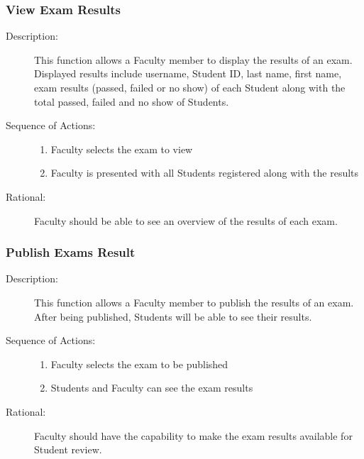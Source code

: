    \subsubsection{\large View Exam Results} 
   \begin{boxed} %
      \begin{description}
         \item[Description:\label{desc:view_results}]
      This function allows a Faculty member to display the results of an
         exam. Displayed results include username, Student ID, last name, first
         name, exam results (passed, failed or no show) of each Student along
         with the total passed, failed and no show of Students.
         
            \item[Sequence of Actions:]\hspace{10cm}
         \begin{enumerate}
               
            \item Faculty selects the exam to view
            \item Faculty is presented with all Students registered along with
               the results
         \end{enumerate}

            \item[Rational:]
         Faculty should be able to see an overview of the results of each exam.
      \end{description}
   \end{boxed} %

   \subsubsection{\large Publish Exams Result} 
   \begin{boxed} %
      \begin{description}
         \item[Description:\label{desc:publish_results}]
      This function allows a Faculty member to publish the results of an
         exam. After being published, Students will be able to see their
         results.
         
            \item[Sequence of Actions:]\hspace{10cm}
         \begin{enumerate}
            \item Faculty selects the exam to be published
            \item Students and Faculty can see the exam results
      \end{enumerate}

            \item[Rational:]
         Faculty should have the capability to make the exam
         results available for Student review.
      \end{description}
   \end{boxed} %

